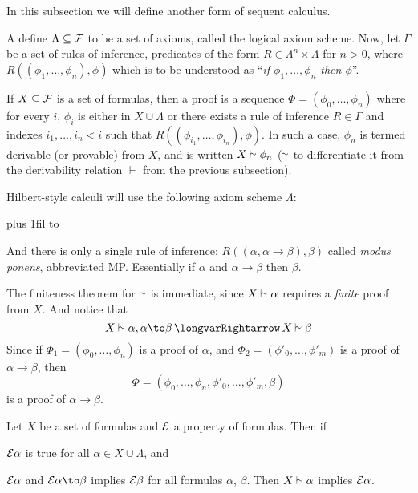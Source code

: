In this subsection we will define another form of sequent calculus.

\bdefn

    A define $\Lambda\subseteq{\cal F}$ to be a set of axioms, called the {\emphcolor logical axiom scheme}.
    Now, let $\Gamma$ be a set of {\emphcolor rules of inference}, predicates of the form $R\in\Lambda^n\times\Lambda$ for $n>0$, where $R((\phi_1,\dots,\phi_n),\phi)$ which is to be understood as
    ``{\it if $\phi_1,\dots,\phi_n$ then $\phi$}''.

    If $X\subseteq{\cal F}$ is a set of formulas, then a {\emphcolor proof} is a sequence $\Phi=(\phi_0,\dots,\phi_n)$ where for every $i$, $\phi_i$ is either in $X\cup\Lambda$ or there
    exists a rule of inference $R\in\Gamma$ and indexes $i_1,\dots,i_n<i$ such that $R((\phi_{i_1},\dots,\phi_{i_n}),\phi)$.
    In such a case, $\phi_n$ is termed {\emphcolor derivable} (or {\emphcolor provable}) from $X$, and is written $X\vsim\phi_n$ ($\vsim$ to differentiate it from the derivability relation $\vdash$ from
    the previous subsection).

\edefn

Hilbert-style calculi will use the following axiom scheme $\Lambda$:

\medskip
\tabskip=0pt plus 1fil
\halign to 

And there is only a single rule of inference: $R((\alpha,\alpha\to\beta),\beta)$ called {\it modus ponens}, abbreviated MP.
Essentially if $\alpha$ and $\alpha\to\beta$ then $\beta$.

The finiteness theorem for $\vsim$ is immediate, since $X\vsim\alpha$ requires a {\it finite} proof from $X$.
And notice that
$$ X\vsim\alpha,\alpha\to\beta \implies X\vsim\beta $$
Since if $\Phi_1=(\phi_0,\dots,\phi_n)$ is a proof of $\alpha$, and $\Phi_2=(\phi'_0,\dots,\phi'_m)$ is a proof of $\alpha\to\beta$, then
$$ \Phi=(\phi_0,\dots,\phi_n,\phi'_0,\dots,\phi'_m,\beta) $$
is a proof of $\alpha\to\beta$.

\bprop[title=Principle of Induction for $\vsim$, name=vsiminduct]

    Let $X$ be a set of formulas and ${\cal E}$ a property of formulas.
    Then if
    \benum
        \item ${\cal E}\alpha$ is true for all $\alpha\in X\cup\Lambda$, and
        \item ${\cal E}\alpha$ and ${\cal E}\alpha\to\beta$ implies ${\cal E}\beta$ for all formulas $\alpha$, $\beta$.
    \eenum
    Then $X\vsim\alpha$ implies ${\cal E}\alpha$.


